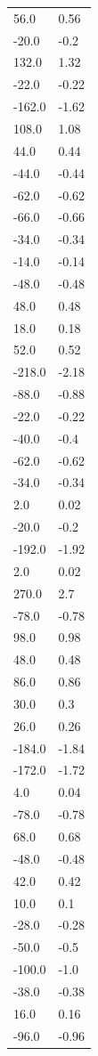\begin{longtable}{ll}
56.0 & 0.56 \\
-20.0 & -0.2 \\
132.0 & 1.32 \\
-22.0 & -0.22 \\
-162.0 & -1.62 \\
108.0 & 1.08 \\
44.0 & 0.44 \\
-44.0 & -0.44 \\
-62.0 & -0.62 \\
-66.0 & -0.66 \\
-34.0 & -0.34 \\
-14.0 & -0.14 \\
-48.0 & -0.48 \\
48.0 & 0.48 \\
18.0 & 0.18 \\
52.0 & 0.52 \\
-218.0 & -2.18 \\
-88.0 & -0.88 \\
-22.0 & -0.22 \\
-40.0 & -0.4 \\
-62.0 & -0.62 \\
-34.0 & -0.34 \\
2.0 & 0.02 \\
-20.0 & -0.2 \\
-192.0 & -1.92 \\
2.0 & 0.02 \\
270.0 & 2.7 \\
-78.0 & -0.78 \\
98.0 & 0.98 \\
48.0 & 0.48 \\
86.0 & 0.86 \\
30.0 & 0.3 \\
26.0 & 0.26 \\
-184.0 & -1.84 \\
-172.0 & -1.72 \\
4.0 & 0.04 \\
-78.0 & -0.78 \\
68.0 & 0.68 \\
-48.0 & -0.48 \\
42.0 & 0.42 \\
10.0 & 0.1 \\
-28.0 & -0.28 \\
-50.0 & -0.5 \\
-100.0 & -1.0 \\
-38.0 & -0.38 \\
16.0 & 0.16 \\
-96.0 & -0.96 \\

\end{longtable}
